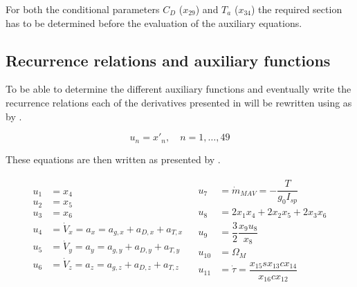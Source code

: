 For both the conditional parameters $C_{D}$ ($x_{29}$) and $T_{a}$ ($x_{34}$) the required section has to be determined before the evaluation of the auxiliary equations.
 

\subsection{Recurrence relations and auxiliary functions}
\label{subsec:recRelAuxFunc}
To be able to determine the different auxiliary functions and eventually write the recurrence relations each of the derivatives presented in  will be rewritten using  as by \cite{scott2008high}. 

\begin{equation} \label{eq:un}
u_{n}=x'_{n}, \quad n=1,\dotsc,49
\end{equation}

These equations are then written as presented by .

\begin{align} \label{eq:unAuxEq1}
\begin{split} 
u_{1}&=x_{4}\\
u_{2}&=x_{5}\\
u_{3}&=x_{6} \\
u_{4}&=\dot{V}_{x}=a_{x}=a_{g,x}+a_{D,x}+a_{T,x}\\
u_{5}&=\dot{V}_{y}=a_{y}=a_{g,y}+a_{D,y}+a_{T,y}\\
u_{6}&=\dot{V}_{z}=a_{z}=a_{g,z}+a_{D,z}+a_{T,z}\\
\end{split}
&
\begin{split}
u_{7} &=\dot{m}_{MAV}=-\dfrac{T}{g_{0}I_{sp}}\\
u_{8}&=2x_{1}x_{4}+2x_{2}x_{5}+2x_{3}x_{6}\\
u_{9}&=\dfrac{3}{2}\dfrac{x_{9}u_{8}}{x_{8}}\\
u_{10} &= \Omega_{M} \\
u_{11} &=  \dot{\tau} = \dfrac{x_{15}sx_{13}cx_{14}}{x_{16}cx_{12}}\\
\end{split}
\end{align}

